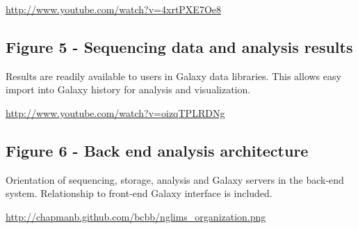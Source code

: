 \documentclass[10pt]{bmc_article}
\newenvironment{bmcformat}{\begin{raggedright}\baselineskip20pt\sloppy\setboolean{publ}{false}}{\end{raggedright}\baselineskip20pt\sloppy}
\begin{document}
\begin{bmcformat}
\url{http://www.youtube.com/watch?v=4xrtPXE7Oe8}

\subsection*{Figure 5 - Sequencing data and analysis results}
Results are readily available to users in Galaxy data libraries. This
allows easy import into Galaxy history for analysis and visualization.

\url{http://www.youtube.com/watch?v=oizqTPLRDNg}

\subsection*{Figure 6 - Back end analysis architecture}
Orientation of sequencing, storage, analysis and Galaxy servers in the
back-end system. Relationship to front-end Galaxy interface is
included.

\url{http://chapmanb.github.com/bcbb/nglims_organization.png}

\end{bmcformat}
\end{document}
